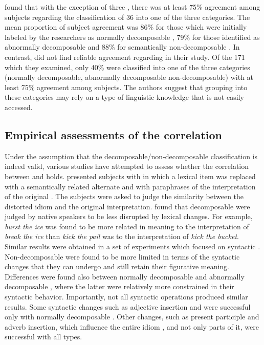 \documentclass[output=paper]{langsci/langscibook}
\begin{document}
\citet{gibbs89} found that with the exception of three , there was at least 75\% agreement among subjects regarding the classification of 36  into one of the three categories.
The mean proportion of subject agreement was 86\% for those  which were initially labeled by the researchers as normally decomposable , 79\% for those identified as abnormally decomposable  and 88\% for semantically non-de\-com\-pos\-able .
In contrast, \citet{titoneconnine94} did not find reliable agreement regarding
 in their study. Of the 171  which they examined, only 40\% were classified into one of the three categories (normally decomposable, abnormally decomposable non-decomposable) with at least 75\% agreement among subjects. The authors suggest that grouping  into these categories may rely on a type of linguistic knowledge that is not easily accessed.


\subsection{Empirical assessments of the correlation}

Under the assumption that the decomposable\slash non-decomposable
classification is indeed valid, various studies have attempted to
assess whether the correlation between  and 
holds.
\citet{gibbs89} presented subjects with  in which a lexical item was replaced with a semantically related alternate and with paraphrases of the interpretation of the original . The subjects were asked to judge the similarity between the distorted idiom and the original interpretation. \citeauthor{gibbs89} found that decomposable  were judged by native speakers to be less disrupted by lexical changes. For example, \textit{burst the ice} was found to be more related in meaning to the interpretation of \textit{break the ice} than \textit{kick the pail} was to the interpretation of \textit{kick the bucket}. Similar results were obtained in a set of experiments which focused on syntactic  \citep{gibbsnayak89psycho}. Non-decomposable  were found to be more limited in terms of the syntactic changes that they can undergo and still retain their figurative meaning. Differences were found also between normally decomposable and abnormally decomposable , where the latter were relatively more constrained in their syntactic behavior. Importantly, not all syntactic operations produced similar results. Some syntactic changes such as adjective insertion and  were successful only with normally decomposable . Other changes, such as present participle and adverb insertion, which influence the entire idiom , and not only parts of it, were successful with all types.
\end{document}
